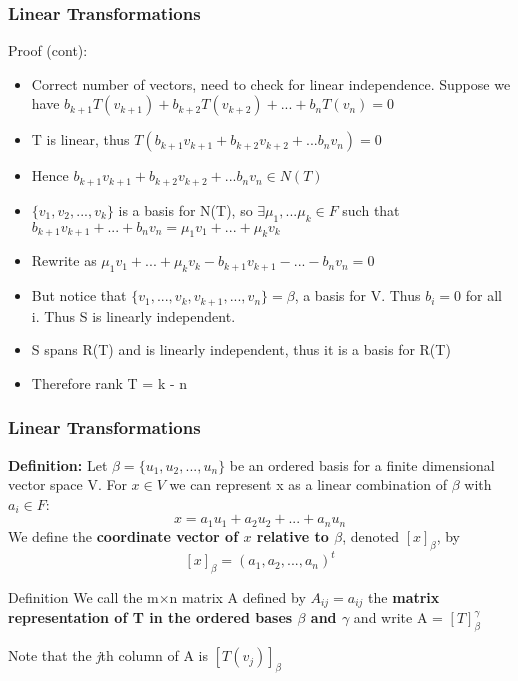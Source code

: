 \documentclass[11pt]{beamer}
\begin{document}
\begin{frame}
	\frametitle{Linear Transformations}
	Proof (cont):
	\begin{itemize}
		[default]
		\item Correct number of vectors, need to check for linear independence. Suppose we have
		$b_{k+1}T(v_{k+1}) + b_{k+2}T(v_{k+2}) + ... + b_{n}T(v_{n}) = 0$
		\item T is linear, thus $T\left( b_{k+1}v_{k+1} + b_{k+2}v_{k+2} + ... b_{n}v_{n} \right) = 0 $
		\item Hence $ b_{k+1}v_{k+1} + b_{k+2}v_{k+2} + ... b_{n}v_{n} \in N(T) $
		\item $\{v_{1}, v_{2}, ... , v_{k}\}$ is a basis for N(T), so $\exists \mu_{1},...\mu_{k} \in F$ such that $b_{k+1}v_{k+1} + ... + b_{n}v_{n} = \mu_{1}v_{1} + ... + \mu_{k}v_{k}$
		\item Rewrite as $\mu_{1}v_{1} + ... + \mu_{k}v_{k} - b_{k+1}v_{k+1} - ... - b_{n}v_{n} = 0$
		\item But notice that $\{v_{1}, ..., v_{k}, v_{k+1}, ..., v_{n} \} = \beta $, a basis for V. Thus $b_{i} = 0$ for all i. Thus S is linearly independent.
		\item S spans R(T) and is linearly independent, thus it is a basis for R(T)
		\item Therefore rank T = k - n
	\end{itemize}
\end{frame}

\begin{frame}
	\frametitle{Linear Transformations}
	\textbf{Definition:} Let $\beta = \{u_{1}, u_{2}, ..., u_{n}\}$ be an ordered basis for a finite dimensional vector space V. For $x \in V$ we can represent x as a linear combination of $\beta$ with $a_{i} \in F$:
	\[x = a_{1}u_{1} + a_{2}u_{2} + ... + a_{n}u_{n}\]
	We define the \textbf{coordinate vector of $x$ relative to $\beta$}, denoted $\left[x\right]_{\beta}$, by
	\[ \left[x\right]_{\beta} = (a_{1}, a_{2}, ..., a_{n})^{t}\]
	
	\begin{block}{Definition}
		We call the m$\times$n matrix A defined by $A_{ij} = a_{ij}$ the \textbf{matrix representation of T in the ordered bases $\beta$ and $\gamma$} and write A = $\left[ T \right]^{\gamma}_{\beta}$
	\end{block}

Note that the \textit{j}th column of A is $\left[T(v_{j})\right]_{\beta}$
\end{frame}
\end{document}
